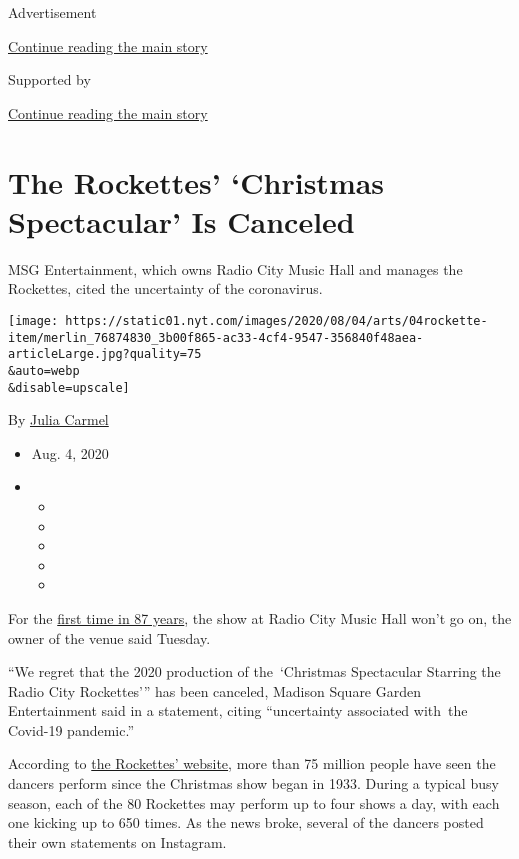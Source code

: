 Advertisement

\protect\hyperlink{after-top}{Continue reading the main story}

Supported by

\protect\hyperlink{after-sponsor}{Continue reading the main story}

\hypertarget{the-rockettes-christmas-spectacular-is-canceled}{%
\section{The Rockettes' `Christmas Spectacular' Is
Canceled}\label{the-rockettes-christmas-spectacular-is-canceled}}

MSG Entertainment, which owns Radio City Music Hall and manages the
Rockettes, cited the uncertainty of the coronavirus.

\texttt{[image: https://static01.nyt.com/images/2020/08/04/arts/04rockette-item/merlin\_76874830\_3b00f865-ac33-4cf4-9547-356840f48aea-articleLarge.jpg?quality=75\\\&auto=webp\\\&disable=upscale]}

By \href{https://www.nytimes.com/by/julia-carmel}{Julia Carmel}

\begin{itemize}
\item
  Aug. 4, 2020
\item
  \begin{itemize}
  \item
  \item
  \item
  \item
  \item
  \end{itemize}
\end{itemize}

For the
\href{https://www.rockettes.com/blog/fun-facts-about-the-radio-city-christmas-spectacular-and-the-rockettes/}{first
time in 87 years}, the show at Radio City Music Hall won't go on, the
owner of the venue said Tuesday.

``We regret that the 2020 production of the~`Christmas Spectacular
Starring the Radio City Rockettes''' has been canceled, Madison Square
Garden Entertainment said in a statement, citing ``uncertainty
associated with~the Covid-19 pandemic.''

According to \href{https://www.rockettes.com/blog/}{the Rockettes'
website}, more than 75 million people have seen the dancers perform
since the Christmas show began in 1933. During a typical busy season,
each of the 80 Rockettes may perform up to four shows a day, with each
one kicking up to 650 times. As the news broke, several of the dancers
posted their own statements on Instagram.

